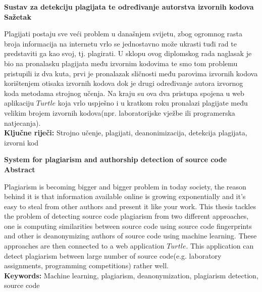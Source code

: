 \begin{center}
\textbf{Sustav za detekciju plagijata te određivanje autorstva izvornih kodova} \\
\textbf{Sažetak}
\end{center}

	Plagijati postaju sve veći problem u današnjem svijetu, zbog ogromnog rasta broja informacija na internetu vrlo se jednostavno može ukrasti tuđi rad te predstaviti ga kao svoj, tj. plagirati. U sklopu ovog diplomskog rada naglasak je bio na pronalasku plagijata među izvornim kodovima te smo tom problemu pristupili iz dva kuta, prvi je pronalazak sličnosti među parovima izvornih kodova korištenjem otisaka izvornih kodova dok je drugi određivanje autora izvornog koda metodama strojnog učenja. Na kraju su ova dva pristupa spojena u web aplikaciju $Turtle$ koja vrlo uspješno i u kratkom roku pronalazi plagijate među velikim brojem izvornih kodova(npr. laboratorijske vježbe ili programerska natjecanja). \\
	
\noindent \textbf{Ključne riječi:} Strojno učenje, plagijati, deanonimizacija, detekcija plagijata, izvorni kod

\begin{center}
\textbf{System for plagiarism and authorship detection of source code} \\
\textbf{Abstract}
\end{center}

	Plagiarism is becoming bigger and bigger problem in today society, the reason behind it is that information available online is growing exponentially and it's easy to steal from other authors and present it like your work. This thesis tackles the problem of detecting source code plagiarism from two different approaches, one is computing similarities between source code using source code fingerprints and other is deanonymizing authors of source code using machine learning. These approaches are then connected to a web application $Turtle$. This application can detect plagiarism between large number of source code(e.g. laboratory assignments, programming competitions) rather well. \\
	
\noindent \textbf{Keywords:} Machine learning, plagiarism, deanonymization, plagiarism detection, source code
